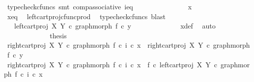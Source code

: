\begin{isabellebody}
\ {\isacharparenleft}{\kern0pt}typecheck{\isacharunderscore}{\kern0pt}cfuncs{\isacharcomma}{\kern0pt}\ smt\ comp{\isacharunderscore}{\kern0pt}associative{}\ i{\isacharunderscore}{\kern0pt}eq{\isacharparenright}{\kern0pt}\isanewline
\ \ \ \ \ \ \ \ \ \ \isamarkupfalse%
\ \isamarkupfalse%
\ {\isachardoublequoteopen}{\isachardot}{\kern0pt}{\isachardot}{\kern0pt}{\isachardot}{\kern0pt}\ {\isacharequal}{\kern0pt}\ x{\isachardoublequoteclose}\isanewline
\ \ \ \ \ \ \ \ \ \ \ \ \isamarkupfalse%
\ x{\isacharprime}{\kern0pt}{\isacharunderscore}{\kern0pt}eq\ \isamarkupfalse%
\ left{\isacharunderscore}{\kern0pt}cart{\isacharunderscore}{\kern0pt}proj{\isacharunderscore}{\kern0pt}cfunc{\isacharunderscore}{\kern0pt}prod\ \isamarkupfalse%
\ {\isacharparenleft}{\kern0pt}typecheck{\isacharunderscore}{\kern0pt}cfuncs{\isacharcomma}{\kern0pt}\ blast{\isacharparenright}{\kern0pt}\isanewline
\ \ \ \ \ \ \ \ \ \ \isamarkupfalse%
\ \isamarkupfalse%
\ {\isachardoublequoteopen}{\isachardot}{\kern0pt}{\isachardot}{\kern0pt}{\isachardot}{\kern0pt}\ {\isacharequal}{\kern0pt}\ left{\isacharunderscore}{\kern0pt}cart{\isacharunderscore}{\kern0pt}proj\ X\ Y\ {\isasymcirc}\isactrlsub c\ graph{\isacharunderscore}{\kern0pt}morph\ f\ {\isasymcirc}\isactrlsub c\ y{\isacharprime}{\kern0pt}{\isachardoublequoteclose}\isanewline
\ \ \ \ \ \ \ \ \ \ \ \ \isamarkupfalse%
\ x{\isacharunderscore}{\kern0pt}def\ \isamarkupfalse%
\ auto\isanewline
\ \ \ \ \ \ \ \ \ \ \isamarkupfalse%
\ \isamarkupfalse%
\ {\isacharquery}{\kern0pt}thesis\isacommand{{\isachardot}{\kern0pt}}\isamarkupfalse%
\isanewline
\ \ \ \ \ \ \ \ \isamarkupfalse%
\isanewline
\isanewline
\ \ \ \ \ \ \ \ \isamarkupfalse%
\ {\isachardoublequoteopen}right{\isacharunderscore}{\kern0pt}cart{\isacharunderscore}{\kern0pt}proj\ X\ Y\ {\isasymcirc}\isactrlsub c\ graph{\isacharunderscore}{\kern0pt}morph\ f\ {\isasymcirc}\isactrlsub c\ i\ {\isasymcirc}\isactrlsub c\ x{\isacharprime}{\kern0pt}\ {\isacharequal}{\kern0pt}\ right{\isacharunderscore}{\kern0pt}cart{\isacharunderscore}{\kern0pt}proj\ X\ Y\ {\isasymcirc}\isactrlsub c\ graph{\isacharunderscore}{\kern0pt}morph\ f\ {\isasymcirc}\isactrlsub c\ y{\isacharprime}{\kern0pt}{\isachardoublequoteclose}\isanewline
\ \ \ \ \ \ \ \ \isamarkupfalse%
\ {\isacharminus}{\kern0pt}\isanewline
\ \ \ \ \ \ \ \ \ \ \isamarkupfalse%
\ {\isachardoublequoteopen}right{\isacharunderscore}{\kern0pt}cart{\isacharunderscore}{\kern0pt}proj\ X\ Y\ {\isasymcirc}\isactrlsub c\ graph{\isacharunderscore}{\kern0pt}morph\ f\ {\isasymcirc}\isactrlsub c\ i\ {\isasymcirc}\isactrlsub c\ x{\isacharprime}{\kern0pt}\ {\isacharequal}{\kern0pt}\ f\ {\isasymcirc}\isactrlsub c\ left{\isacharunderscore}{\kern0pt}cart{\isacharunderscore}{\kern0pt}proj\ X\ Y\ {\isasymcirc}\isactrlsub c\ graph{\isacharunderscore}{\kern0pt}morph\ f\ {\isasymcirc}\isactrlsub c\ i\ {\isasymcirc}\isactrlsub c\ x{\isacharprime}{\kern0pt}{\isachardoublequoteclose}\isanewline

\end{isabellebody}
